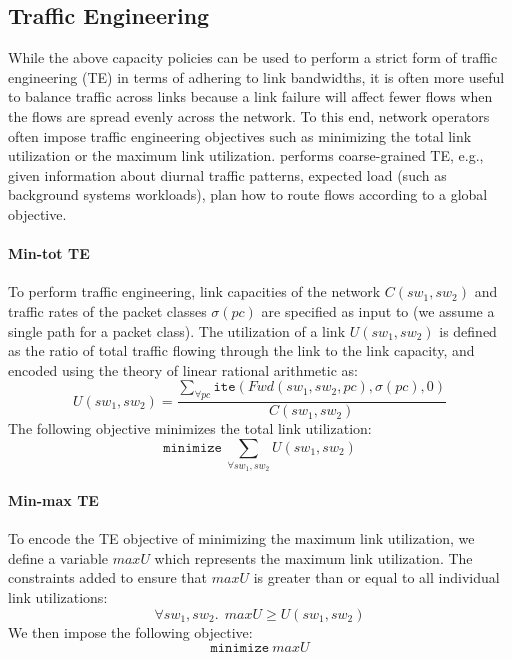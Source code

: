 \subsection{Traffic Engineering}
While the above capacity policies can be used to perform a strict form
of traffic engineering (TE) in terms of adhering to link bandwidths,
it is often more useful to balance traffic across links because a
link failure will affect fewer flows when the flows are spread evenly
across the network.  To this end, network operators often impose
traffic engineering objectives such as minimizing the total link
utilization or the maximum link utilization. 
\name performs coarse-grained TE, 
e.g., given information about diurnal traffic patterns, 
expected load (such as background systems workloads), 
plan how to route flows according to a global objective.

\paragraph{Min-tot TE}
To perform traffic engineering, link capacities of the network $C(sw_1, sw_2)$ and traffic 
rates of the packet classes $\sigma(pc)$ are specified as input to \name (we assume a single
path for a packet class). The utilization 
of a link $U(sw_1, sw_2)$ is defined as the ratio of total traffic flowing through the link to the 
link capacity, and encoded using the theory of linear rational arithmetic as:
\begin{equation}
U(sw_1, sw_2) = \frac{\sum_{\forall pc} \texttt{ite}(Fwd(sw_1,sw_2, pc), \sigma(pc), 0)} {C(sw_1, sw_2)}
\end{equation}
The following objective minimizes the total link utilization:
\begin{equation}
	\texttt{minimize}\ \sum_{\forall sw_1, sw_2} U(sw_1, sw_2)
\end{equation}
\paragraph{Min-max TE}
To encode the TE objective of minimizing the maximum link utilization, we define
a variable $maxU$ which represents the maximum
link utilization. 
The constraints added to ensure that $maxU$ is greater than or equal to all 
individual link utilizations:
\begin{equation} \label{eq:maxu}
\forall sw_1, sw_2.\ \ maxU \geq U(sw_1, sw_2)
\end{equation} 
We then impose the following objective:
\begin{equation}
		\texttt{minimize}\ maxU
\end{equation}
